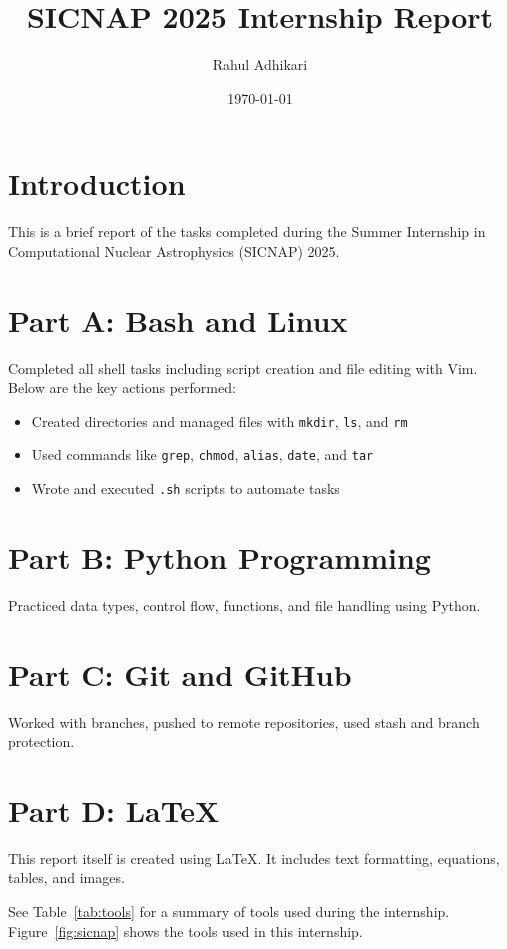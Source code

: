 \documentclass{article}
\title{SICNAP 2025 Internship Report}
\author{Rahul Adhikari}
\date{\today}
\begin{document}
\maketitle

\section{Introduction}
This is a brief report of the tasks completed during the Summer Internship in Computational Nuclear Astrophysics (SICNAP) 2025.

\section{Part A: Bash and Linux}
Completed all shell tasks including script creation and file editing with Vim. Below are the key actions performed:

\begin{itemize}
  \item Created directories and managed files with \texttt{mkdir}, \texttt{ls}, and \texttt{rm}
  \item Used commands like \texttt{grep}, \texttt{chmod}, \texttt{alias}, \texttt{date}, and \texttt{tar}
  \item Wrote and executed \texttt{.sh} scripts to automate tasks
\end{itemize}

\section{Part B: Python Programming} 
Practiced data types, control flow, functions, and file handling using Python.

\section{Part C: Git and GitHub}
Worked with branches, pushed to remote repositories, used stash and branch protection.

\section{Part D: LaTeX}
This report itself is created using LaTeX. It includes text formatting, equations, tables, and images.

See Table~\ref{tab:tools} for a summary of tools used during the internship.  
Figure~\ref{fig:sicnap} shows the tools used in this internship.
\end{document}
